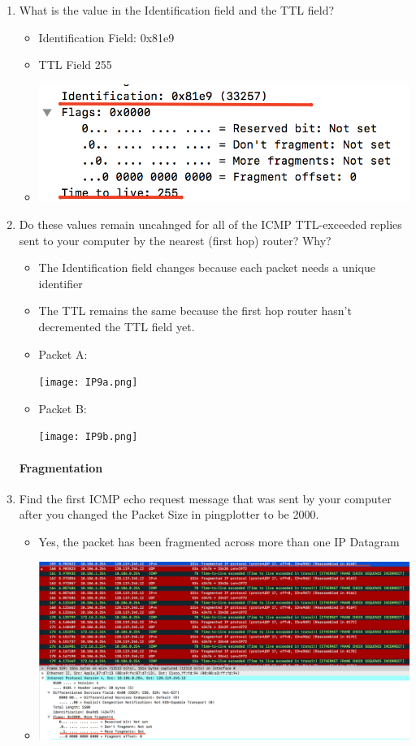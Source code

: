 \documentclass{article}
\begin{document}
\begin{enumerate}
      \item What is the value in the Identification field and the TTL field? 
          \begin{itemize}
            \item Identification Field: 0x81e9 
            \item TTL Field 255
            \item \includegraphics[scale=0.5]{images/IP8.png}
          \end{itemize}

      \item Do these values remain uncahnged for all of the ICMP TTL-exceeded replies sent to your computer by the nearest (first hop) router? Why? 
          \begin{itemize}
            \item The Identification field changes because each packet needs a unique identifier
            \item The TTL remains the same because the first hop router hasn't decremented the TTL field yet.
            \item Packet A:\par\texttt{[image: IP9a.png]}
            \item Packet B:\par\texttt{[image: IP9b.png]}
          \end{itemize}

      \paragraph{Fragmentation}
      \item Find the first ICMP echo request message that was sent by your computer after you changed the Packet Size in pingplotter to be 2000. 
          \begin{itemize}
            \item Yes, the packet has been fragmented across more than one IP Datagram
            \item \includegraphics[scale=0.3]{images/IP10.png}
          \end{itemize}


\end{enumerate}
\end{document}
